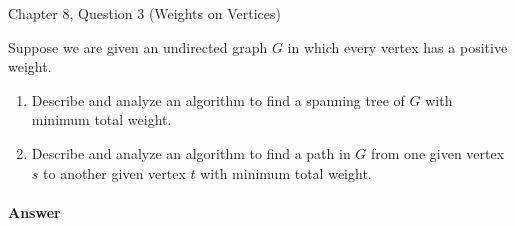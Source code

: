 \documentclass{article}
\begin{document}


\nextprob
{}

Chapter 8, Question 3 (Weights on Vertices)

Suppose we are given an undirected graph $G$ in which every vertex has a positive weight.
\begin{enumerate}[label=(\alph*)]
    \item Describe and analyze an algorithm to find a spanning tree of $G$ with minimum total weight.
    \item Describe and analyze an algorithm to find a path in $G$ from one given vertex $s$ to another given vertex $t$ with minimum total weight.
\end{enumerate}

\paragraph{Answer}
\end{document}
